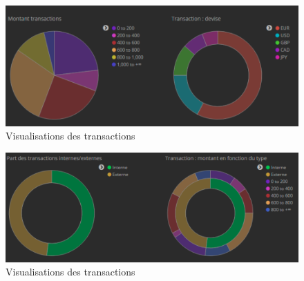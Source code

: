 \begin{figure}[h!]
	\includegraphics[scale=0.5]{images/travailNeuflizeOBC/dashboard/kibanaTransaction_01.png}
	\centering
	\caption{Visualisations des transactions}
\end{figure}

\begin{figure}[h!]
	\includegraphics[scale=0.5]{images/travailNeuflizeOBC/dashboard/kibanaTransaction_02.png}
	\centering
	\caption{Visualisations des transactions}
\end{figure}